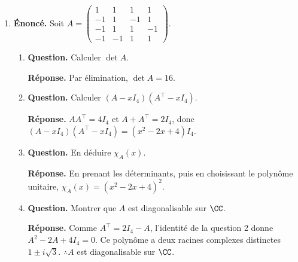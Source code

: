 \documentclass[12pt, a4paper]{article}
\begin{document}
\begin{enumerate}[label=9.\arabic*., start=94]
\begin{minipage}[t]{\linewidth}
\begin{enumerate}[\arabic*.]
  \item \textbf{Question.} Exprimer $D^{-1}$ à l’aide de $A,B,C^{-1}$.
\par\smallskip
\textbf{Réponse.} $D^{-1}=I_n+BC^{-1}A$.

  \item \textbf{Question.} En déduire que $AB$ et $BA$ ont les mêmes valeurs propres non nulles.
\par\smallskip
\textbf{Réponse.} Pour $\lambda\neq0$, appliquer le résultat à $A/\lambda$ et $B$ donne
        $\det(\lambda I_m-AB)=0\iff\det(\lambda I_n-BA)=0$.
        Donc les valeurs propres non nulles sont les mêmes.

\end{enumerate}
\end{minipage}

  \item \begin{minipage}[t]{\linewidth}\raggedright
\textbf{Énoncé.} Soit $\displaystyle A=\begin{pmatrix}1&1&1&1\\-1&1&-1&1\\-1&1&1&-1\\-1&-1&1&1\end{pmatrix}$.

\begin{enumerate}[\arabic*.]
        \item \textbf{Question.} Calculer $\det A$.
\par\smallskip
\textbf{Réponse.} Par élimination, $\det A=16$.

  \item \textbf{Question.} Calculer $(A-xI_4)(A^\top-xI_4)$.
\par\smallskip
\textbf{Réponse.} $AA^\top=4I_4$ et $A+A^\top=2I_4$, donc $(A-xI_4)(A^\top-xI_4)=(x^2-2x+4)I_4$.

  \item \textbf{Question.} En déduire $\chi_A(x)$.
\par\smallskip
\textbf{Réponse.} En prenant les déterminants, puis en choisissant le polynôme unitaire,
        $\chi_A(x)=(x^2-2x+4)^2$.

  \item \textbf{Question.} Montrer que $A$ est diagonalisable sur $\CC$.
\par\smallskip
\textbf{Réponse.} Comme $A^\top=2I_4-A$, l'identité de la question 2 donne $A^2-2A+4I_4=0$.
        Ce polynôme a deux racines complexes distinctes $1\pm i\sqrt3$.
        $\therefore A$ est diagonalisable sur $\CC$.


\end{enumerate}
\end{minipage}
\end{enumerate}
\end{document}
